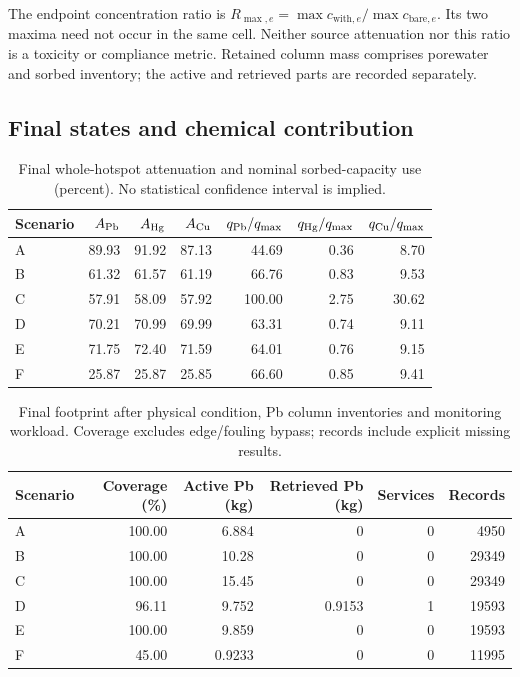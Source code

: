 The endpoint concentration ratio is $R_{\max,e}=\max c_{\mathrm{with},e}/\max c_{\mathrm{bare},e}$. Its two maxima need not occur in the same cell. Neither source attenuation nor this ratio is a toxicity or compliance metric. Retained column mass comprises porewater and sorbed inventory; the active and retrieved parts are recorded separately.

\subsection{Final states and chemical contribution}
\begin{table}[htbp]\centering\small
\caption{Final whole-hotspot attenuation and nominal sorbed-capacity use (percent). No statistical confidence interval is implied.}\label{tab:all-metals}
\begin{tabular}{lrrrrrr}\toprule
Scenario & $A_{\rm Pb}$ & $A_{\rm Hg}$ & $A_{\rm Cu}$ & $q_{\rm Pb}/q_{\max}$ & $q_{\rm Hg}/q_{\max}$ & $q_{\rm Cu}/q_{\max}$ \\
\midrule
A & 89.93 & 91.92 & 87.13 & 44.69 & 0.36 & 8.70 \\
B & 61.32 & 61.57 & 61.19 & 66.76 & 0.83 & 9.53 \\
C & 57.91 & 58.09 & 57.92 & 100.00 & 2.75 & 30.62 \\
D & 70.21 & 70.99 & 69.99 & 63.31 & 0.74 & 9.11 \\
E & 71.75 & 72.40 & 71.59 & 64.01 & 0.76 & 9.15 \\
F & 25.87 & 25.87 & 25.85 & 66.60 & 0.85 & 9.41 \\
\bottomrule\end{tabular}\end{table}

\begin{table}[htbp]\centering\small
\caption{Final footprint after physical condition, Pb column inventories and monitoring workload. Coverage excludes edge/fouling bypass; records include explicit missing results.}\label{tab:scenario-results}
\begin{tabular}{lrrrrr}\toprule
Scenario & Coverage (\%) & Active Pb (kg) & Retrieved Pb (kg) & Services & Records \\
\midrule
A & 100.00 & 6.884 & 0 & 0 & 4950 \\
B & 100.00 & 10.28 & 0 & 0 & 29349 \\
C & 100.00 & 15.45 & 0 & 0 & 29349 \\
D & 96.11 & 9.752 & 0.9153 & 1 & 19593 \\
E & 100.00 & 9.859 & 0 & 0 & 19593 \\
F & 45.00 & 0.9233 & 0 & 0 & 11995 \\
\bottomrule\end{tabular}\end{table}

